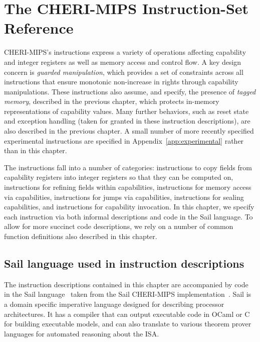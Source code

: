 \chapter{The CHERI-MIPS Instruction-Set Reference}
\label{chap:isaref-mips}

CHERI-MIPS's instructions express a variety of operations affecting capability
and integer registers as well as memory access and control flow.
A key design concern is {\em guarded manipulation}, which provides
a set of constraints
across all instructions that ensure monotonic non-increase in rights through
capability manipulations.
These instructions also assume, and specify, the presence of {\em tagged
memory}, described in the previous chapter, which protects in-memory
representations of capability values.
Many further behaviors, such as reset state and exception handling (taken for
granted in these instruction descriptions), are also described in the previous
chapter.
A small number of more recently specified experimental instructions are
specified in Appendix~\ref{app:experimental} rather than in this chapter.

The instructions fall into a number of categories: instructions to copy
fields from capability registers into integer registers so that they
can be computed on, instructions for refining fields within capabilities, instructions for memory access via
capabilities, instructions for jumps via capabilities, instructions for sealing capabilities, and instructions for capability invocation.
In this chapter, we specify each instruction via both informal descriptions
and code in the Sail language.
To allow for more succinct code descriptions, we rely on a number of
common function definitions also described in this chapter.


\newcommand{\cchecktag}{\emph{cb}.\ctag{} is not set.}

\section{Sail language used in instruction descriptions}
\label{sec:sail-language-description}

\newcommand{\isail}[1]{\lstinline[language=sail]{#1}}

The instruction descriptions contained in this chapter are accompanied
by code in the Sail language~\cite{sail-popl2019,sail-url} taken from the Sail CHERI-MIPS implementation~\cite{sail-cheri-mips}.  Sail is
a domain specific imperative language designed for describing
processor architectures.  It has a compiler that can output executable
code in OCaml or C for building executable models, and can also
translate to various theorem prover languages for automated reasoning
about the ISA.

